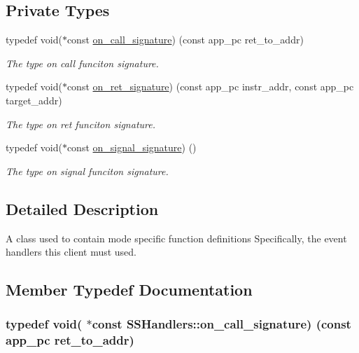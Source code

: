 \subsection*{Private Types}
\begin{DoxyCompactItemize}
\item 
typedef void($\ast$const \hyperlink{class_s_s_handlers_ac55de17666a40e5d50d854ef65f01be9}{on\+\_\+call\+\_\+signature}) (const app\+\_\+pc ret\+\_\+to\+\_\+addr)
\begin{DoxyCompactList}\small\item\em The type \textquotesingle{}on call\textquotesingle{} funciton signature. \end{DoxyCompactList}\item 
typedef void($\ast$const \hyperlink{class_s_s_handlers_ade1360265360f4e67c782a00951850ab}{on\+\_\+ret\+\_\+signature}) (const app\+\_\+pc instr\+\_\+addr, const app\+\_\+pc target\+\_\+addr)
\begin{DoxyCompactList}\small\item\em The type \textquotesingle{}on ret\textquotesingle{} funciton signature. \end{DoxyCompactList}\item 
typedef void($\ast$const \hyperlink{class_s_s_handlers_a63287bfa685457954f9bed08635dca2d}{on\+\_\+signal\+\_\+signature}) ()
\begin{DoxyCompactList}\small\item\em The type \textquotesingle{}on signal\textquotesingle{} funciton signature. \end{DoxyCompactList}\end{DoxyCompactItemize}


\subsection{Detailed Description}
A class used to contain mode specific function definitions Specifically, the event handlers this client must used. 

\subsection{Member Typedef Documentation}
\subsubsection[{\texorpdfstring{on\+\_\+call\+\_\+signature}{on_call_signature}}]{\setlength{\rightskip}{0pt plus 5cm}typedef void( $\ast$const S\+S\+Handlers\+::on\+\_\+call\+\_\+signature) (const app\+\_\+pc ret\+\_\+to\+\_\+addr)\hspace{0.3cm}{\ttfamily [private]}}\hypertarget{class_s_s_handlers_ac55de17666a40e5d50d854ef65f01be9}{}\label{class_s_s_handlers_ac55de17666a40e5d50d854ef65f01be9}


